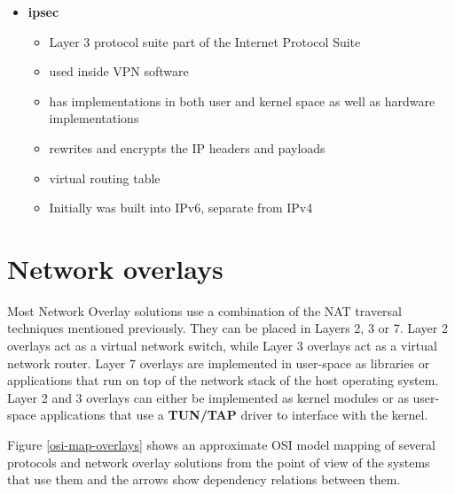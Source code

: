 \begin{itemize}
\tightlist
\item
  \textbf{\acrfull{ipsec}}

  \begin{itemize}
  \tightlist
  \item
    Layer 3 protocol suite part of the Internet Protocol Suite
  \item
    used inside VPN software
  \item
    has implementations in both user and kernel space as well as
    hardware implementations
  \item
    rewrites and encrypts the IP headers and payloads
  \item
    virtual routing table
  \item
    Initially was built into IPv6, separate from IPv4
  \end{itemize}
\end{itemize}

\hypertarget{sec:overlays}{%
\section{Network overlays}\label{sec:overlays}}

Most Network Overlay solutions use a combination of the NAT traversal
techniques mentioned previously. They can be placed in Layers 2, 3 or 7.
Layer 2 overlays act as a virtual network switch, while Layer 3 overlays
act as a virtual network router. Layer 7 overlays are implemented in
user-space as libraries or applications that run on top of the network
stack of the host operating system. Layer 2 and 3 overlays can either be
implemented as kernel modules or as user-space applications that use a
\textbf{TUN/TAP} driver to interface with the kernel.

Figure \ref{osi-map-overlays} shows an approximate OSI model mapping of
several protocols and network overlay solutions from the point of view
of the systems that use them and the arrows show dependency relations
between them.

